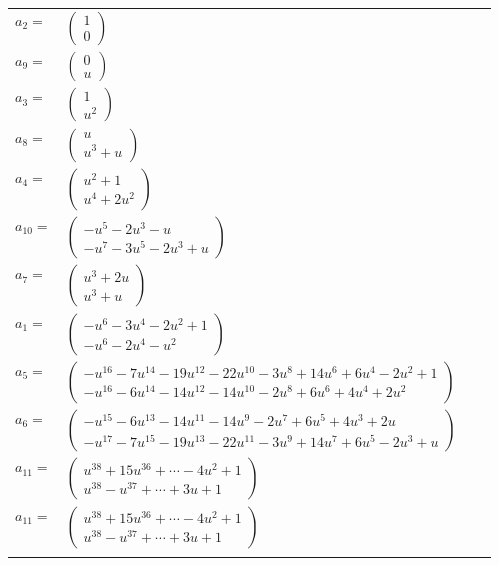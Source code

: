 \documentclass[1p]{elsarticle_modified}
\theoremstyle{definition}
\begin{document}
\begin{tabular}{m{7pt} m{180pt} m{7pt} m{180pt} }
\flushright $a_{2}=$&$\begin{pmatrix}1\\0\end{pmatrix}$ \\
\flushright $a_{9}=$&$\begin{pmatrix}0\\u\end{pmatrix}$ \\
\flushright $a_{3}=$&$\begin{pmatrix}1\\u^2\end{pmatrix}$ \\
\flushright $a_{8}=$&$\begin{pmatrix}u\\u^3+u\end{pmatrix}$ \\
\flushright $a_{4}=$&$\begin{pmatrix}u^2+1\\u^4+2 u^2\end{pmatrix}$ \\
\flushright $a_{10}=$&$\begin{pmatrix}- u^5-2 u^3- u\\- u^7-3 u^5-2 u^3+u\end{pmatrix}$ \\
\flushright $a_{7}=$&$\begin{pmatrix}u^3+2 u\\u^3+u\end{pmatrix}$ \\
\flushright $a_{1}=$&$\begin{pmatrix}- u^6-3 u^4-2 u^2+1\\- u^6-2 u^4- u^2\end{pmatrix}$ \\
\flushright $a_{5}=$&$\begin{pmatrix}- u^{16}-7 u^{14}-19 u^{12}-22 u^{10}-3 u^8+14 u^6+6 u^4-2 u^2+1\\- u^{16}-6 u^{14}-14 u^{12}-14 u^{10}-2 u^8+6 u^6+4 u^4+2 u^2\end{pmatrix}$ \\
\flushright $a_{6}=$&$\begin{pmatrix}- u^{15}-6 u^{13}-14 u^{11}-14 u^9-2 u^7+6 u^5+4 u^3+2 u\\- u^{17}-7 u^{15}-19 u^{13}-22 u^{11}-3 u^9+14 u^7+6 u^5-2 u^3+u\end{pmatrix}$ \\
\flushright $a_{11}=$&$\begin{pmatrix}u^{38}+15 u^{36}+\cdots-4 u^2+1\\u^{38}- u^{37}+\cdots+3 u+1\end{pmatrix}$\\ \flushright $a_{11}=$&$\begin{pmatrix}u^{38}+15 u^{36}+\cdots-4 u^2+1\\u^{38}- u^{37}+\cdots+3 u+1\end{pmatrix}$\\&\end{tabular}
\end{document}
